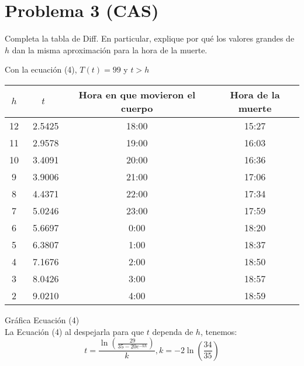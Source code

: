 \section*{Problema 3 (CAS)}
Completa la tabla de Diff. En particular, explique por qué los valores grandes de $h$ dan la misma aproximación para la hora de la muerte.

\begin{center}
    Con la ecuación (4), $T(t) = 99$ y $t > h$\\ 
    \vspace{10pt}
    \begin{tabular}{ |c|c|c|c| } 
        \hline
        $h$ & $t$ & Hora en que movieron el cuerpo & Hora de la muerte \\ 
        \hline
        12 & ~2.5425 & 18:00 & 15:27\\
        \hline
        11 & ~2.9578 & 19:00 & 16:03\\
        \hline
        10 & ~3.4091 & 20:00 & 16:36\\
        \hline
        9 & ~3.9006 & 21:00 & 17:06\\
        \hline
        8 & ~4.4371 & 22:00 & 17:34\\
        \hline
        7 & ~5.0246 & 23:00 & 17:59\\
        \hline
        6 & ~5.6697 & 0:00 & 18:20\\
        \hline
        5 & ~6.3807 & 1:00 & 18:37\\
        \hline
        4 & ~7.1676 & 2:00 & 18:50\\
        \hline
        3 & ~8.0426 & 3:00 & 18:57\\
        \hline
        2 & ~9.0210 & 4:00 & 18:59\\
        \hline
    \end{tabular}

    \vspace{10pt}


    Gráfica Ecuación (4)\\
    La Ecuación (4) al despejarla para que $t$ dependa de $h$, tenemos:
    \begin{equation*}
        t = \frac{\ln{\left(\frac{29}{35-20e^{-kh}}\right)}}{k}, k = -2\ln{\left(\frac{34}{35}\right)}
    \end{equation*}
\end{center} 
